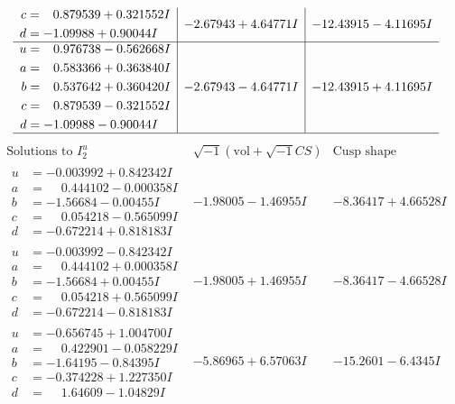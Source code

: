 \documentclass[1p]{elsarticle_modified}
\theoremstyle{definition}
\newcommand{\I}{\sqrt{-1}}
\begin{document}
$$\begin{array}{c|c|c}
\begin{aligned}
c &= \phantom{-}0.879539 + 0.321552 I \\
d &= -1.09988 + 0.90044 I\end{aligned}
 & -2.67943 + 4.64771 I & -12.43915 - 4.11695 I \\ \hline\begin{aligned}
u &= \phantom{-}0.976738 - 0.562668 I \\
a &= \phantom{-}0.583366 + 0.363840 I \\
b &= \phantom{-}0.537642 + 0.360420 I \\
c &= \phantom{-}0.879539 - 0.321552 I \\
d &= -1.09988 - 0.90044 I\end{aligned}
 & -2.67943 - 4.64771 I & -12.43915 + 4.11695 I\\
 \hline 
 \end{array}$$\newpage$$\begin{array}{c|c|c}  
\text{Solutions to }I^u_{2}& \I (\text{vol} + \sqrt{-1}CS) & \text{Cusp shape}\\
 \hline 
\begin{aligned}
u &= -0.003992 + 0.842342 I \\
a &= \phantom{-}0.444102 - 0.000358 I \\
b &= -1.56684 - 0.00455 I \\
c &= \phantom{-}0.054218 - 0.565099 I \\
d &= -0.672214 + 0.818183 I\end{aligned}
 & -1.98005 - 1.46955 I & -8.36417 + 4.66528 I \\ \hline\begin{aligned}
u &= -0.003992 - 0.842342 I \\
a &= \phantom{-}0.444102 + 0.000358 I \\
b &= -1.56684 + 0.00455 I \\
c &= \phantom{-}0.054218 + 0.565099 I \\
d &= -0.672214 - 0.818183 I\end{aligned}
 & -1.98005 + 1.46955 I & -8.36417 - 4.66528 I \\ \hline\begin{aligned}
u &= -0.656745 + 1.004700 I \\
a &= \phantom{-}0.422901 - 0.058229 I \\
b &= -1.64195 - 0.84395 I \\
c &= -0.374228 + 1.227350 I \\
d &= \phantom{-}1.64609 - 1.04829 I\end{aligned}
 & -5.86965 + 6.57063 I & -15.2601 - 6.4345 I \\ \hline\begin{aligned}

\end{aligned}
\end{array}$$
\end{document}
